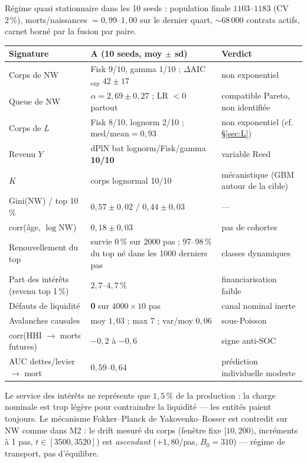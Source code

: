 \documentclass[11pt,a4paper]{article}
\newcommand{\NW}{\mathrm{NW}}
\begin{document}
Régime quasi stationnaire dans les 10 seeds : population finale
$1103$--$1183$ (CV $2\,\%$), morts/naissances $= 0{,}99$--$1{,}00$ sur le
dernier quart, $\sim 68\,000$ contrats actifs, carnet borné par la fusion
par paire.

\begin{center}
\small
\begin{tabular}{lll}
\toprule
Signature & A (10 seeds, moy $\pm$ sd) & Verdict \\
\midrule
Corps de $\NW$ & Fisk 9/10, gamma 1/10 ; $\Delta$AIC$_{\exp}$ $42 \pm 17$ &
non exponentiel \\
Queue de $\NW$ & $\alpha = 2{,}69 \pm 0{,}27$ ; LR $< 0$ partout &
compatible Pareto, non identifiée \\
Corps de $L$ & Fisk 8/10, lognorm 2/10 ; $\mathrm{med/mean} = 0{,}93$ &
non exponentiel (cf. §\ref{sec:L}) \\
Revenu $Y$ & dPlN bat lognorm/Fisk/gamma \textbf{10/10} & variable Reed \\
$K$ & corps lognormal 10/10 & mécanistique (GBM autour de la cible) \\
Gini($\NW$) / top 10\,\% & $0{,}57 \pm 0{,}02$ / $0{,}44 \pm 0{,}03$ & --- \\
corr(âge, $\log \NW$) & $0{,}18 \pm 0{,}03$ & pas de cohortes \\
Renouvellement du top & survie 0\,\% sur 2000 pas ; 97--98\,\% du top né
dans les 1000 derniers pas & classes dynamiques \\
Part des intérêts (revenu top 1\,\%) & $2{,}7$--$4{,}7\,\%$ &
financiarisation faible \\
Défauts de liquidité & \textbf{0} sur $4000 \times 10$ pas &
canal nominal inerte \\
Avalanches causales & moy $1{,}03$ ; max 7 ; var/moy $0{,}06$ &
sous-Poisson \\
corr(HHI $\to$ morts futures) & $-0{,}2$ à $-0{,}6$ &
signe anti-SOC \\
AUC dettes/levier $\to$ mort & $0{,}59$--$0{,}64$ &
prédiction individuelle modeste \\
\bottomrule
\end{tabular}
\end{center}

Le service des intérêts ne représente que $1{,}5\,\%$ de la production : la
charge nominale est trop légère pour contraindre la liquidité — les entités
paient toujours. Le mécanisme Fokker--Planck de Yakovenko--Rosser est
contredit sur $\NW$ comme dans M2 : le drift mesuré du corps (fenêtre fixe
$[10, 200)$, incréments à 1 pas, $t \in [3500, 3520]$) est \emph{ascendant}
($+1{,}80$/pas, $B_0 = 310$) — régime de transport, pas d'équilibre.
\end{document}
